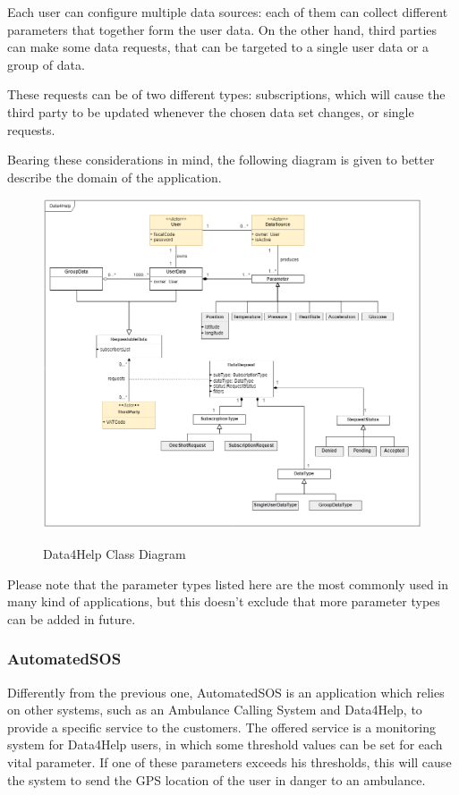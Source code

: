 Each user can configure multiple data sources: each of them can collect different parameters that together form the user data. On the other hand, third parties can make some data requests, that can be targeted to a single user data or a group of data.

These requests can be of two different types: subscriptions, which will cause the third party to be updated whenever the chosen data set changes, or single requests.

Bearing these considerations in mind, the following diagram is given to better describe the domain of the application.

\FloatBarrier
\begin{figure}[h!]
	\centering
	\includegraphics[width = \linewidth] {../Diagrams/ClassDiagram-General.png}\\[1.0 cm]
	\caption{Data4Help Class Diagram}
\end{figure}
\FloatBarrier

Please note that the parameter types listed here are the most commonly used in many kind of applications, but this doesn't exclude that more parameter types can be added in future.

\newpage

\subsubsection{AutomatedSOS}
Differently from the previous one, AutomatedSOS is an application which relies on other systems, such as an Ambulance Calling System and Data4Help, to provide a specific service to the customers. 
The offered service is a monitoring system for Data4Help users, in which some threshold values can be set for each vital parameter. If one of these parameters exceeds his thresholds, this will cause the system to send the GPS location of the user in danger to an ambulance.

